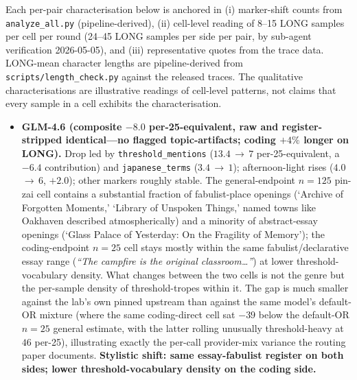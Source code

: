 \documentclass[11pt,a4paper]{article}
\begin{document}
Each per-pair characterisation below is anchored in (i) marker-shift counts from \texttt{analyze\_all.py} (pipeline-derived), (ii) cell-level reading of 8--15 LONG samples per cell per round (24--45 LONG samples per side per pair, by sub-agent verification 2026-05-05), and (iii) representative quotes from the trace data. LONG-mean character lengths are pipeline-derived from \texttt{scripts/length\_check.py} against the released traces. The qualitative characterisations are illustrative readings of cell-level patterns, not claims that every sample in a cell exhibits the characterisation.

\begin{sloppypar}
\begin{itemize}[leftmargin=2em, itemsep=0.3em, topsep=0.3em]
\item \textbf{GLM-4.6 (composite $-8.0$ per-25-equivalent, raw and register-stripped identical---no flagged topic-artifacts; coding $+4\%$ longer on LONG).} Drop led by \texttt{threshold\_mentions} ($13.4$\,$\rightarrow$\,$7$ per-25-equivalent, a $-6.4$ contribution) and \texttt{japanese\_terms} ($3.4$\,$\rightarrow$\,$1$); afternoon-light rises ($4.0$\,$\rightarrow$\,$6$, $+2.0$); other markers roughly stable. The general-endpoint $n{=}125$ pin-zai cell contains a substantial fraction of fabulist-place openings (`Archive of Forgotten Moments,' `Library of Unspoken Things,' named towns like Oakhaven described atmospherically) and a minority of abstract-essay openings (`Glass Palace of Yesterday: On the Fragility of Memory'); the coding-endpoint $n{=}25$ cell stays mostly within the same fabulist/declarative essay range (\emph{``The campfire is the original classroom\ldots''}) at lower threshold-vocabulary density. What changes between the two cells is not the genre but the per-sample density of threshold-tropes within it. The gap is much smaller against the lab's own pinned upstream than against the same model's default-OR mixture (where the same coding-direct cell sat $-39$ below the default-OR $n{=}25$ general estimate, with the latter rolling unusually threshold-heavy at $46$ per-25), illustrating exactly the per-call provider-mix variance the routing paper documents. \textbf{Stylistic shift: same essay-fabulist register on both sides; lower threshold-vocabulary density on the coding side.}


\end{itemize}
\end{sloppypar}
\end{document}
